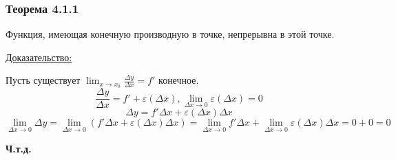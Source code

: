 \documentclass[12pt]{article}
\let\ORIincludegraphics\includegraphics
\renewcommand{\includegraphics}[2][]{\ORIincludegraphics[scale=0.65,#1]{#2}}
\begin{document}
    
    \subsubsection*{Теорема 4.1.1}\label{th:4.1.1}
    Функция, имеющая конечную производную в точке, непрерывна в этой точке.\par\noindent
    \underline{Доказательство:}
    \begin{adjustwidth}{1.5em}{1.5em}
        Пусть существует $\lim_{x\to x_0} \frac{\Delta y}{\Delta x} = f'$ конечное.
        \[ \frac{\Delta y}{\Delta x} = f' + \varepsilon(\Delta x), \lim_{\Delta x \to 0}\varepsilon(\Delta x) = 0 \]
        \[ \Delta y = f' \Delta x + \varepsilon(\Delta x)\Delta x \]
        \[ \lim_{\Delta x \to 0} \Delta y = \lim_{\Delta x \to 0} (f' \Delta x + \varepsilon(\Delta x)\Delta x) = \lim_{\Delta x \to 0} f'\Delta x + \lim_{\Delta x \to 0} \varepsilon(\Delta x)\Delta x = 0 + 0 = 0 \]
        \begin{center}
            \textbf{Ч.т.д.}
        \end{center}
    \end{adjustwidth}
\end{document}
